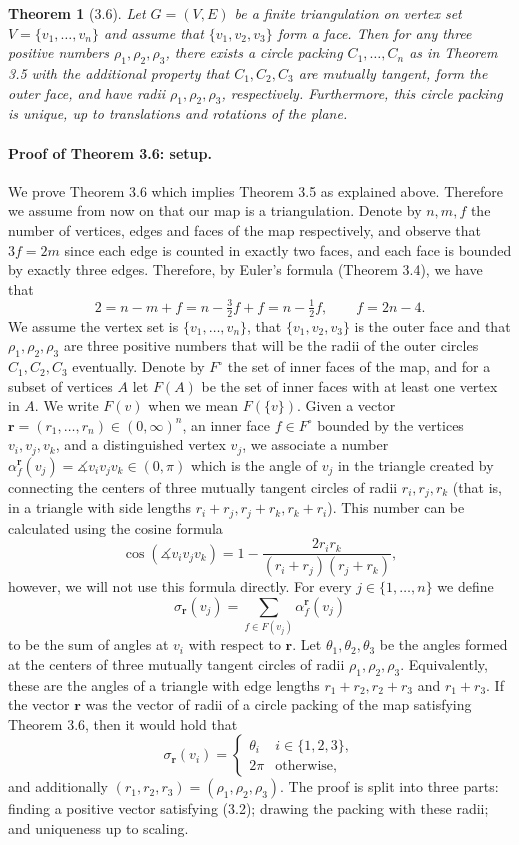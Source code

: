 \documentclass[UTF8,11pt]{ctexart}
\newtheorem*{theorem}{Theorem}
\theoremstyle{definition}
\begin{document}
\begin{theorem}[3.6]
Let $G=(V,E)$ be a finite triangulation on vertex set $V=\{v_1,\ldots,v_n\}$ and assume that $\{v_1,v_2,v_3\}$ form a face. Then for any three positive numbers $\rho_1,\rho_2,\rho_3$, there exists a circle packing $C_1,\ldots,C_n$ as in Theorem 3.5 with the additional property that $C_1,C_2,C_3$ are mutually tangent, form the outer face, and have radii $\rho_1,\rho_2,\rho_3$, respectively. Furthermore, this circle packing is unique, up to translations and rotations of the plane.
\end{theorem}
\paragraph{Proof of Theorem 3.6: setup.}
We prove Theorem 3.6 which implies Theorem 3.5 as explained above. Therefore we assume from now on that our map is a triangulation. Denote by $n,m,f$ the number of vertices, edges and faces of the map respectively, and observe that $3f=2m$ since each edge is counted in exactly two faces, and each face is bounded by exactly three edges. Therefore, by Euler's formula (Theorem 3.4), we have that
\[
2=n-m+f=n-\tfrac32 f+f=n-\tfrac12f,\qquad f=2n-4.\tag{3.1}
\]
We assume the vertex set is $\{v_1,\ldots,v_n\}$, that $\{v_1,v_2,v_3\}$ is the outer face and that $\rho_1,\rho_2,\rho_3$ are three positive numbers that will be the radii of the outer circles $C_1,C_2,C_3$ eventually. Denote by $F^\circ$ the set of inner faces of the map, and for a subset of vertices $A$ let $F(A)$ be the set of inner faces with at least one vertex in $A$. We write $F(v)$ when we mean $F(\{v\})$.
Given a vector $\mathbf r=(r_1,\ldots,r_n)\in(0,\infty)^n$, an inner face $f\in F^\circ$ bounded by the vertices $v_i,v_j,v_k$, and a distinguished vertex $v_j$, we associate a number $\alpha_f^{\mathbf r}(v_j)=\measuredangle v_iv_jv_k\in(0,\pi)$ which is the angle of $v_j$ in the triangle created by connecting the centers of three mutually tangent circles of radii $r_i,r_j,r_k$ (that is, in a triangle with side lengths $r_i+r_j,r_j+r_k,r_k+r_i$). This number can be calculated using the cosine formula
\[
\cos(\measuredangle v_iv_jv_k)=1-\frac{2r_ir_k}{(r_i+r_j)(r_j+r_k)},
\]
however, we will not use this formula directly. For every $j\in\{1,\ldots,n\}$ we define
\[
\sigma_{\mathbf r}(v_j)=\sum_{f\in F(v_j)}\alpha_f^{\mathbf r}(v_j)
\]
to be the sum of angles at $v_i$ with respect to $\mathbf r$. Let $\theta_1,\theta_2,\theta_3$ be the angles formed at the centers of three mutually tangent circles of radii $\rho_1,\rho_2,\rho_3$. Equivalently, these are the angles of a triangle with edge lengths $r_1+r_2,r_2+r_3$ and $r_1+r_3$. If the vector $\mathbf r$ was the vector of radii of a circle packing of the map satisfying Theorem 3.6, then it would hold that
\[
\sigma_{\mathbf r}(v_i)=\begin{cases}\theta_i&i\in\{1,2,3\},\\2\pi&\text{otherwise},\end{cases}\tag{3.2}
\]
and additionally $(r_1,r_2,r_3)=(\rho_1,\rho_2,\rho_3)$. The proof is split into three parts: finding a positive vector satisfying (3.2); drawing the packing with these radii; and uniqueness up to scaling.
\end{document}
